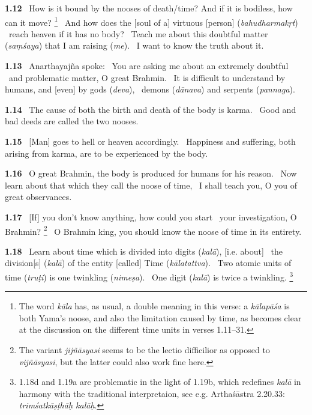 \documentclass{article}
\newcommand{\skt}[1]{\textit{#1}}
\begin{document}
\textbf{1.12}%
\ How is it bound by the nooses of death/time? And if it is bodiless, how can it move?%
\footnote{The word \skt{kāla} has, as usual, a double meaning in this verse: a \skt{kālapāśa}                        is both Yama's noose, and also the limitation caused by time,                         as becomes clear at the discussion                        on the different time units in verses 1.11--31. }%
\ And how does the [soul of a] virtuous [person] (\skt{bahudharmakṛt})%
\                      reach heaven if it has no body?%
\ Teach me about this doubtful matter (\skt{saṃśaya}) that I am raising (\skt{me}).%
\                                         I want to know the truth about it.%


\textbf{1.13}%
\ Anarthayajña spoke:%
\ You are asking me about an extremely doubtful%
\                         and problematic matter, O great Brahmin.%
\ It is difficult to understand by humans, and [even] by gods (\skt{deva}),%
\                         demons (\skt{dānava}) and serpents (\skt{pannaga}).%


\textbf{1.14}%
\ The cause of both the birth and death of the body is karma.%
\ Good and bad deeds are called the two nooses.%


\textbf{1.15}%
\ [Man] goes to hell or heaven accordingly.%
\ Happiness and suffering, both arising from karma, are to be experienced by the body.%


\textbf{1.16}%
\ O great Brahmin, the body is produced for humans for his reason.%
\ Now learn about that which they call the noose of time,%
\                         I shall teach you, O you of great observances.%


\textbf{1.17}%
\ [If] you don't know anything, how could you start%
\                                 your investigation, O Brahmin?%
\footnote{The variant \skt{jijñāsyasi} seems to be the lectio difficilior as opposed to                        \skt{vijñāsyasi}, but the latter could also work fine here. }%
\ O Brahmin king, you should know the noose of time in its entirety.%


\textbf{1.18}%
\ Learn about time which is divided into digits (\skt{kalā}), [i.e. about]%
\                         the division[s] (\skt{kalā}) of the entity [called] Time (\skt{kālatattva}).%
\ Two atomic units of time (\skt{truṭi}) is one twinkling (\skt{nimeṣa}).%
\                      One digit (\skt{kalā}) is twice a twinkling.%
\footnote{1.18d and 1.19a are problematic in the light of 1.19b, which                         redefines \skt{kalā} in harmony with the traditional                        interpretaion, see e.g. Arthaśāstra 2.20.33: \skt{trimśatkāṣṭhāḥ kalāḥ}. }%
\end{document}
